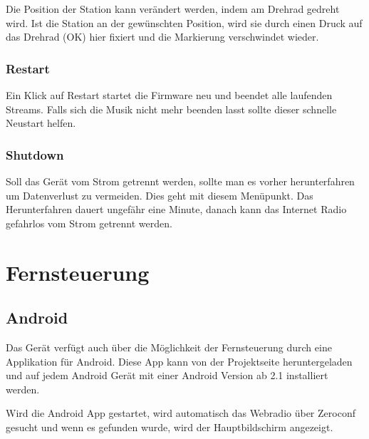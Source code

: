 \documentclass[12pt,a4paper,openany]{memoir}
\begin{document}
Die Position der Station kann verändert werden, indem am Drehrad gedreht wird. Ist die Station an der gewünschten Position, 
wird sie durch einen Druck auf das Drehrad (OK) hier fixiert und die Markierung verschwindet wieder. 

\subsection{Restart}
Ein Klick auf Restart startet die Firmware neu und beendet alle laufenden Streams. Falls sich die Musik nicht mehr beenden lasst sollte dieser schnelle Neustart helfen. 

\subsection{Shutdown}
Soll das Gerät vom Strom getrennt werden, sollte man es vorher herunterfahren um Datenverlust zu vermeiden. Dies geht mit diesem Menüpunkt. 
Das Herunterfahren dauert ungefähr eine Minute, danach kann das Internet Radio gefahrlos vom Strom getrennt werden. 


\chapter{Fernsteuerung}

\section{Android}
Das Gerät verfügt auch über die Möglichkeit der Fernsteuerung durch eine Applikation für Android. Diese App kann von der Projektseite heruntergeladen und auf 
jedem Android Gerät mit einer Android Version ab 2.1 installiert werden. 

Wird die Android App gestartet, wird automatisch das Webradio über Zeroconf gesucht und wenn es gefunden wurde, wird der Hauptbildschirm angezeigt.

\end{document}
